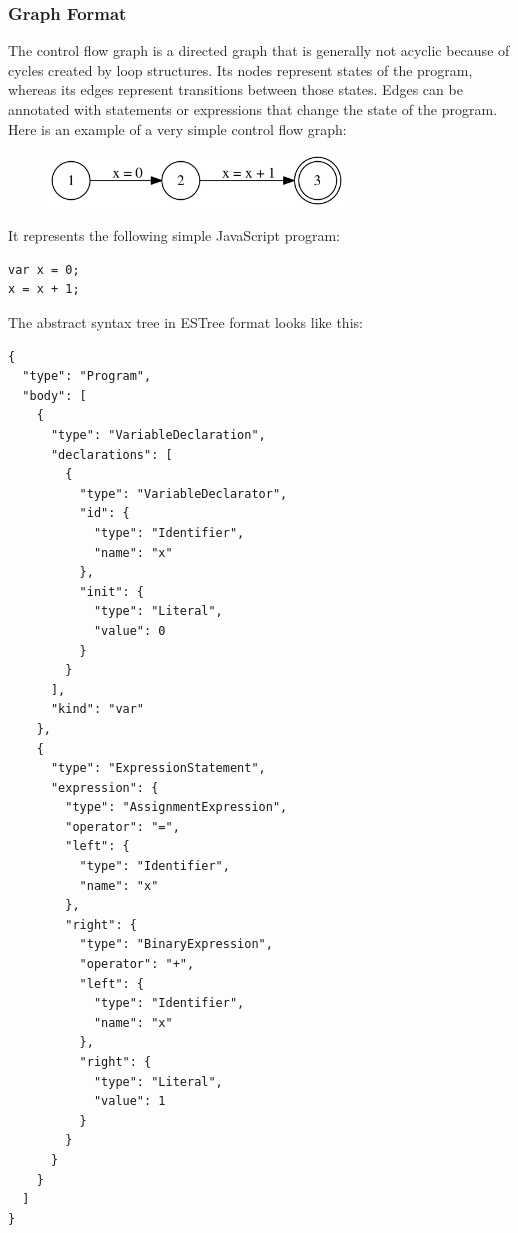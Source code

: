 \subsubsection{Graph Format}

The control flow graph is a directed graph that is generally not acyclic because of cycles created by loop structures. Its nodes represent states of the program, whereas its edges represent transitions between those states. Edges can be annotated with statements or expressions that change the state of the program. Here is an example of a very simple control flow graph:

\begin{figure}[h]
  \centering
  \includegraphics[width=0.7\textwidth]{sections/algorithm/images/simple-cfg}
\end{figure}

It represents the following simple JavaScript program:

\begin{verbatim}
var x = 0;
x = x + 1;
\end{verbatim}

The abstract syntax tree in ESTree format looks like this:

\begin{verbatim}
{
  "type": "Program",
  "body": [
    {
      "type": "VariableDeclaration",
      "declarations": [
        {
          "type": "VariableDeclarator",
          "id": {
            "type": "Identifier",
            "name": "x"
          },
          "init": {
            "type": "Literal",
            "value": 0
          }
        }
      ],
      "kind": "var"
    },
    {
      "type": "ExpressionStatement",
      "expression": {
        "type": "AssignmentExpression",
        "operator": "=",
        "left": {
          "type": "Identifier",
          "name": "x"
        },
        "right": {
          "type": "BinaryExpression",
          "operator": "+",
          "left": {
            "type": "Identifier",
            "name": "x"
          },
          "right": {
            "type": "Literal",
            "value": 1
          }
        }
      }
    }
  ]
}
\end{verbatim}
